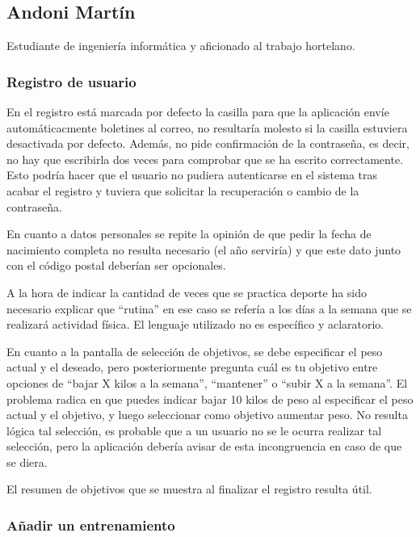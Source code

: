 \documentclass[a4paper]{article}
\begin{document}
		\subsection{Andoni Martín}
		
			Estudiante de ingeniería informática y aficionado al trabajo hortelano.
		
			\subsubsection*{Registro de usuario}
			
			En el registro está marcada por defecto la casilla para que la aplicación envíe automáticacmente boletines al correo, no resultaría molesto si la casilla estuviera desactivada por defecto. Además, no pide confirmación de la contraseña, es decir, no hay que escribirla dos veces para comprobar que se ha escrito correctamente. Esto podría hacer que el usuario no pudiera autenticarse en el sistema tras acabar el registro y tuviera que solicitar la recuperación o cambio de la contraseña.
			
			En cuanto a datos personales se repite la opinión de que pedir la fecha de nacimiento completa no resulta necesario (el año serviría) y que este dato junto con el código postal deberían ser opcionales.
			
			A la hora de indicar la cantidad de veces que se practica deporte ha sido necesario explicar que ``rutina'' en ese caso se refería a los días a la semana que se realizará actividad física. El lenguaje utilizado no es específico y aclaratorio.
			
			En cuanto a la pantalla de selección de objetivos, se debe especificar el peso actual y el deseado, pero posteriormente pregunta cuál es tu objetivo entre opciones de ``bajar X kilos a la semana'', ``mantener'' o ``subir X a la semana''. El problema radica en que puedes indicar bajar 10 kilos de peso al especificar el peso actual y el objetivo, y luego seleccionar como objetivo aumentar peso. No resulta lógica tal selección, es probable que a un usuario no se le ocurra realizar tal selección, pero la aplicación debería avisar de esta incongruencia en caso de que se diera.
			
			El resumen de objetivos que se muestra al finalizar el registro resulta útil.
			
			\subsubsection*{Añadir un entrenamiento}
			
\end{document}
